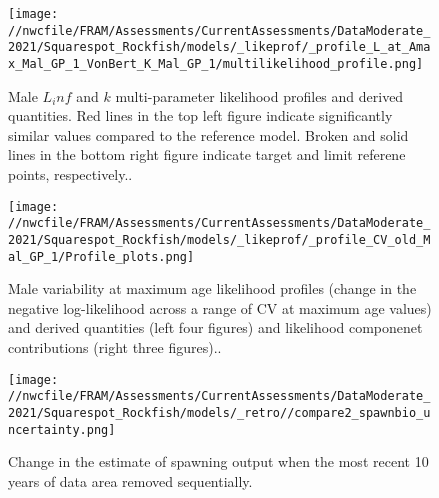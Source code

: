 \documentclass[11pt,
  english,
  a4paper,
]{article}
\begin{document}
\begin{figure}
\centering
\texttt{[image: //nwcfile/FRAM/Assessments/CurrentAssessments/DataModerate\_2021/Squarespot\_Rockfish/models/\_likeprof/\_profile\_L\_at\_Amax\_Mal\_GP\_1\_VonBert\_K\_Mal\_GP\_1/multilikelihood\_profile.png]}
\caption{Male {\(L_inf\)\leavevmode\tagmcend\tagstructend} and {\(k\)\leavevmode\tagmcend\tagstructend} multi-parameter likelihood profiles and derived quantities. Red lines in the top left figure indicate significantly similar values compared to the reference model. Broken and solid lines in the bottom right figure indicate target and limit referene points, respectively..\label{fig:Linf_k_m-profile}}
\end{figure}

\tagmcend\tagstructend


\begin{figure}
\centering
\texttt{[image: //nwcfile/FRAM/Assessments/CurrentAssessments/DataModerate\_2021/Squarespot\_Rockfish/models/\_likeprof/\_profile\_CV\_old\_Mal\_GP\_1/Profile\_plots.png]}
\caption{Male variability at maximum age likelihood profiles (change in the negative log-likelihood across a range of CV at maximum age values) and derived quantities (left four figures) and likelihood componenet contributions (right three figures)..\label{fig:CVold_m-profile-combo}}
\end{figure}

\tagmcend\tagstructend


\begin{figure}
\centering
\texttt{[image: //nwcfile/FRAM/Assessments/CurrentAssessments/DataModerate\_2021/Squarespot\_Rockfish/models/\_retro//compare2\_spawnbio\_uncertainty.png]}
\caption{Change in the estimate of spawning output when the most recent 10 years of data area removed sequentially.\label{fig:retro-ssb}}
\end{figure}
\end{document}

